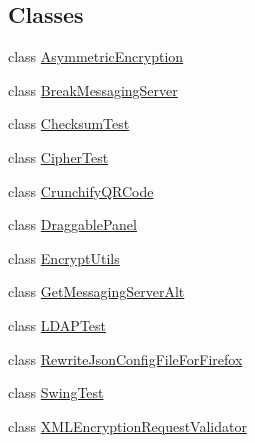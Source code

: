 \subsection*{Classes}
\begin{DoxyCompactItemize}
\item 
class \hyperlink{classgov_1_1fnal_1_1ppd_1_1dd_1_1testing_1_1AsymmetricEncryption}{Asymmetric\-Encryption}
\item 
class \hyperlink{classgov_1_1fnal_1_1ppd_1_1dd_1_1testing_1_1BreakMessagingServer}{Break\-Messaging\-Server}
\item 
class \hyperlink{classgov_1_1fnal_1_1ppd_1_1dd_1_1testing_1_1ChecksumTest}{Checksum\-Test}
\item 
class \hyperlink{classgov_1_1fnal_1_1ppd_1_1dd_1_1testing_1_1CipherTest}{Cipher\-Test}
\item 
class \hyperlink{classgov_1_1fnal_1_1ppd_1_1dd_1_1testing_1_1CrunchifyQRCode}{Crunchify\-Q\-R\-Code}
\item 
class \hyperlink{classgov_1_1fnal_1_1ppd_1_1dd_1_1testing_1_1DraggablePanel}{Draggable\-Panel}
\item 
class \hyperlink{classgov_1_1fnal_1_1ppd_1_1dd_1_1testing_1_1EncryptUtils}{Encrypt\-Utils}
\item 
class \hyperlink{classgov_1_1fnal_1_1ppd_1_1dd_1_1testing_1_1GetMessagingServerAlt}{Get\-Messaging\-Server\-Alt}
\item 
class \hyperlink{classgov_1_1fnal_1_1ppd_1_1dd_1_1testing_1_1LDAPTest}{L\-D\-A\-P\-Test}
\item 
class \hyperlink{classgov_1_1fnal_1_1ppd_1_1dd_1_1testing_1_1RewriteJsonConfigFileForFirefox}{Rewrite\-Json\-Config\-File\-For\-Firefox}
\item 
class \hyperlink{classgov_1_1fnal_1_1ppd_1_1dd_1_1testing_1_1SwingTest}{Swing\-Test}
\item 
class \hyperlink{classgov_1_1fnal_1_1ppd_1_1dd_1_1testing_1_1XMLEncryptionRequestValidator}{X\-M\-L\-Encryption\-Request\-Validator}
\end{DoxyCompactItemize}

